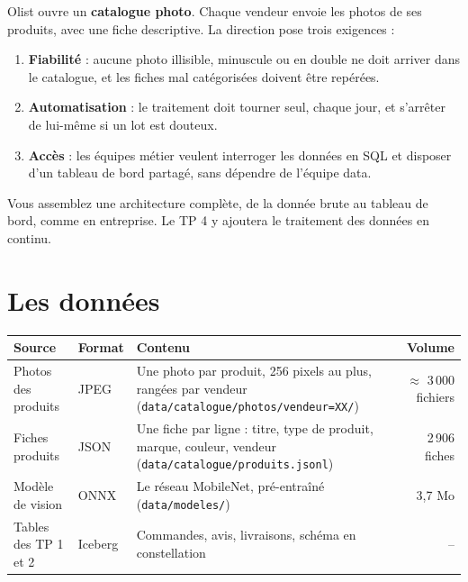 \documentclass[11pt,a4paper]{article}
\newcommand{\cmd}[1]{\texttt{#1}}
\begin{document}
Olist ouvre un \textbf{catalogue photo}. Chaque vendeur envoie les photos de ses produits, avec une
fiche descriptive. La direction pose trois exigences :

\begin{enumerate}[leftmargin=*,nosep]
  \item \textbf{Fiabilité} : aucune photo illisible, minuscule ou en double ne doit arriver dans le
        catalogue, et les fiches mal catégorisées doivent être repérées.
  \item \textbf{Automatisation} : le traitement doit tourner seul, chaque jour, et s'arrêter de
        lui-même si un lot est douteux.
  \item \textbf{Accès} : les équipes métier veulent interroger les données en SQL et disposer d'un
        tableau de bord partagé, sans dépendre de l'équipe data.
\end{enumerate}

Vous assemblez une architecture complète, de la donnée brute au tableau de bord, comme en
entreprise. Le TP 4 y ajoutera le traitement des données en continu.

\section{Les données}

\begin{center}
\small
\renewcommand{\arraystretch}{1.25}
\begin{tabularx}{\textwidth}{@{}l l X r@{}}
\toprule
\textbf{Source} & \textbf{Format} & \textbf{Contenu} & \textbf{Volume} \\
\midrule
Photos des produits & JPEG & Une photo par produit, 256 pixels au plus, rangées par vendeur
  (\cmd{data/catalogue/photos/vendeur=XX/}) & $\approx$ 3\,000 fichiers \\
Fiches produits & JSON & Une fiche par ligne : titre, type de produit, marque, couleur, vendeur
  (\cmd{data/catalogue/produits.jsonl}) & 2\,906 fiches \\
Modèle de vision & ONNX & Le réseau MobileNet, pré-entraîné (\cmd{data/modeles/}) & 3,7 Mo \\
Tables des TP 1 et 2 & Iceberg & Commandes, avis, livraisons, schéma en constellation & -- \\
\bottomrule
\end{tabularx}
\end{center}
\end{document}
